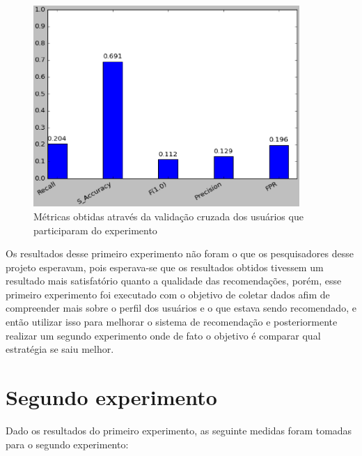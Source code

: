 \begin{figure}[h]
  \centering
  \includegraphics[width=0.9\textwidth]{figuras/primeiro_experimento_cross_validation.eps}
  \caption{Métricas obtidas através da validação cruzada dos usuários que
  participaram do experimento}
  \label{fig:primeiro_experimento_cross_validation}
\end{figure}

Os resultados desse primeiro experimento não foram o que os pesquisadores desse
projeto esperavam, pois esperava-se que os resultados obtidos tivessem um
resultado mais satisfatório quanto a qualidade das recomendações, porém, esse
primeiro experimento foi executado com o objetivo de coletar dados afim de
compreender mais sobre o perfil dos usuários e o que estava sendo recomendado,
e então utilizar isso para melhorar o sistema de recomendação e posteriormente
realizar um segundo experimento onde de fato o objetivo é comparar qual
estratégia se saiu melhor.

\section{Segundo experimento}

Dado os resultados do primeiro experimento, as seguinte medidas foram tomadas
para o segundo experimento:

